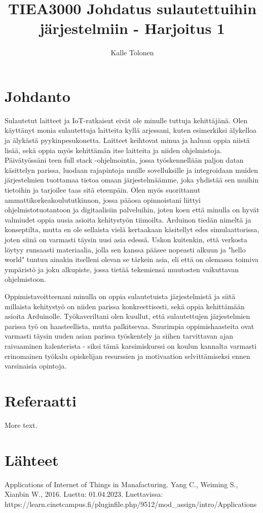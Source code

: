 \documentclass[11pt]{article} %
\title{TIEA3000 Johdatus sulautettuihin järjestelmiin - Harjoitus 1}
\author{Kalle Tolonen}
\begin{document}
\maketitle

\section{Johdanto}

Sulautetut laitteet ja IoT-ratkaisut eivät ole minulle tuttuja kehittäjänä. Olen käyttänyt monia sulautettuja laitteita kyllä arjessani, kuten esimerkiksi älykelloa ja älykästä pyykinpesukonetta. Laitteet keihtovat minua ja haluan oppia niistä lisää, sekä oppia myös kehittämän itse laitteita ja niiden ohjelmistoja. Päivätyössäni teen full stack -ohjelmointia, jossa työskennellään paljon datan käsittelyn parissa, luodaan rajapintoja muille sovelluksille ja integroidaan muiden järjestelmien tuottamaa tietoa omaan järjestelmäämme, joka yhdistää sen muihin tietoihin ja tarjoilee taas sitä eteenpäin. Olen myös suorittanut ammattikorkeakoulututkinnon, jossa pääosa opinnoistani liittyi ohjelmistotuotantoon ja digitaalisiin palveluihin, joten koen että minulla on hyvät valmiudet oppia uusia asioita kehitystyön tiimoilta. Arduinon tiedän nimeltä ja konseptilta, mutta en ole sellaista vielä kertaakaan käsitellyt edes simulaattorissa, joten siinä on varmasti täysin uusi asia edessä. Uskon kuitenkin, että verkosta löytyy runsaasti materiaalia, jolla sen kanssa pääsee nopeasti alkuun ja "hello world" tuntuu ainakin itselleni olevan se tärkein asia, eli että on olemassa toimiva ympäristö ja joku alkupiste, jossa tietää tekemiensä muutosten vaikuttavan ohjelmistoon.

Oppimistavoitteenani minulla on oppia sulautetuista järjestelmistä ja siitä millaista kehitystyö on niiden parissa konkreettisesti, sekä oppia kehittämään asioita Arduinolle. Työkaveriltani olen kuullut, että sulautettujen järjestelmien parissa työ on haasteellista, mutta palkitsevaa. Suurimpia oppimishaasteita ovat varmasti täysin uuden asian parissa työskentely ja siihen tarvittavan ajan raivaaminen kalenterista - siksi tämä karsimiskurssi on koulun kannalta varmasti erinomainen työkalu opiskelijan resurssien ja motivaation selvittämiseksi ennen varsinaisia opintoja.

\section{Referaatti}

More text.

\section{Lähteet}

Applications of Internet of Things in Manafacturing. Yang C., Weiming S., Xianbin W., 2016. Luettu: 01.04.2023. Luettavissa: https://learn.cinetcampus.fi/pluginfile.php/9512/mod_assign/intro/Applications%
\end{document}
